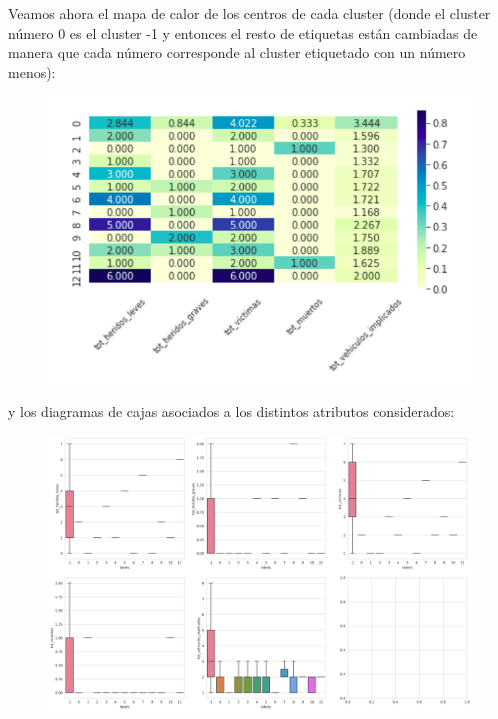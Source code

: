 \documentclass[a4paper,11pt]{book}
\begin{document}
Veamos ahora el mapa de calor de los centros de cada cluster (donde el cluster número 0 es el cluster -1 y entonces el resto de etiquetas están cambiadas de manera que cada número corresponde al cluster etiquetado con un número menos): 
\begin{figure}[H]
	\centering
	\includegraphics[width=0.8\linewidth]{img/heatmap5}
	\caption{}
	\label{fig:heatmap5}
\end{figure}
y los diagramas de cajas asociados a los distintos atributos considerados: \\[5cm]
\begin{figure}[H]
	\centering
	\includegraphics[width=1.1\linewidth]{img/cajas_cluster5}
	\caption{}
	\label{fig:cajascluster5}
\end{figure}
\end{document}
